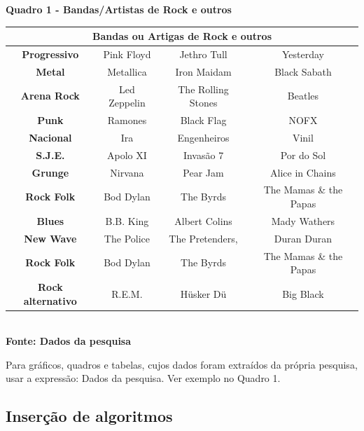    \begin{center}
          \centering
       	\textbf{Quadro 1 - Bandas/Artistas de Rock e outros}\\
        \label{quadro1}
	\begin{tabular}{|c|c|c|c|} \hline
	\multicolumn{4}{|c|}{\textbf{Bandas ou Artigas de Rock e outros}} 	  \\ 
		\hline \textbf{	Progressivo} & Pink Floyd & Jethro Tull	& Yesterday \\ 
		 \hline \textbf{ Metal}  & Metallica & Iron Maidam & Black Sabath \\ 
		\hline \textbf{	Arena Rock} & Led Zeppelin & The Rolling Stones & Beatles \\ 
		\hline \textbf{ Punk} & Ramones & Black Flag & NOFX	\\ 
		\hline \textbf{	Nacional} & Ira & Engenheiros & Vinil	\\ 
		\hline \textbf{	S.J.E.} & Apolo XI & Invasão 7 & Por do Sol \\ 
		\hline \textbf{	Grunge} & Nirvana & Pear Jam & Alice in Chains	\\ 
		\hline \textbf{	Rock Folk} & Bod Dylan & The Byrds &  The Mamas \& the Papas \\
		\hline \textbf{	Blues} & B.B. King & Albert Colins & Mady Wathers \\ 
		\hline \textbf{	New Wave} & The Police & The Pretenders, &  Duran Duran\\ 
 		\hline \textbf{	Rock Folk} & Bod Dylan & The Byrds &  The Mamas \& the Papas \\
 		\hline \textbf{	Rock alternativo} & R.E.M.& Hüsker Dü & Big Black\\ 
 		
		\hline
	\end{tabular}
	\vspace{0.1cm} 
	{\footnotesize\\ \textbf{Fonte: Dados da pesquisa}}
   \end{center}

Para gráficos, quadros e tabelas, cujos dados foram extraídos da própria pesquisa, 
 usar a expressão: Dados da pesquisa. Ver exemplo no Quadro 1.
   

\subsection{\esp Inserção de algoritmos}

